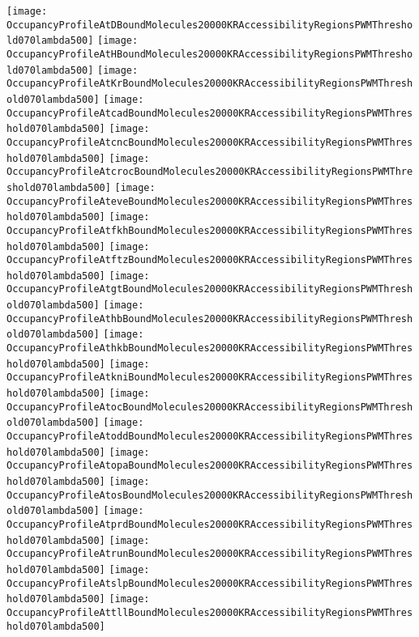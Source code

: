 \documentclass[11pt]{article}
\begin{document}
 


\begin{center}
\texttt{[image: OccupancyProfileAtDBoundMolecules20000KRAccessibilityRegionsPWMThreshold070lambda500]}
\texttt{[image: OccupancyProfileAtHBoundMolecules20000KRAccessibilityRegionsPWMThreshold070lambda500]}
\texttt{[image: OccupancyProfileAtKrBoundMolecules20000KRAccessibilityRegionsPWMThreshold070lambda500]}
\texttt{[image: OccupancyProfileAtcadBoundMolecules20000KRAccessibilityRegionsPWMThreshold070lambda500]}
\texttt{[image: OccupancyProfileAtcncBoundMolecules20000KRAccessibilityRegionsPWMThreshold070lambda500]}
\texttt{[image: OccupancyProfileAtcrocBoundMolecules20000KRAccessibilityRegionsPWMThreshold070lambda500]}
\texttt{[image: OccupancyProfileAteveBoundMolecules20000KRAccessibilityRegionsPWMThreshold070lambda500]}
\texttt{[image: OccupancyProfileAtfkhBoundMolecules20000KRAccessibilityRegionsPWMThreshold070lambda500]}
\texttt{[image: OccupancyProfileAtftzBoundMolecules20000KRAccessibilityRegionsPWMThreshold070lambda500]}
\texttt{[image: OccupancyProfileAtgtBoundMolecules20000KRAccessibilityRegionsPWMThreshold070lambda500]}
\texttt{[image: OccupancyProfileAthbBoundMolecules20000KRAccessibilityRegionsPWMThreshold070lambda500]}
\texttt{[image: OccupancyProfileAthkbBoundMolecules20000KRAccessibilityRegionsPWMThreshold070lambda500]}
\texttt{[image: OccupancyProfileAtkniBoundMolecules20000KRAccessibilityRegionsPWMThreshold070lambda500]}
\texttt{[image: OccupancyProfileAtocBoundMolecules20000KRAccessibilityRegionsPWMThreshold070lambda500]}
\texttt{[image: OccupancyProfileAtoddBoundMolecules20000KRAccessibilityRegionsPWMThreshold070lambda500]}
\texttt{[image: OccupancyProfileAtopaBoundMolecules20000KRAccessibilityRegionsPWMThreshold070lambda500]}
\texttt{[image: OccupancyProfileAtosBoundMolecules20000KRAccessibilityRegionsPWMThreshold070lambda500]}
\texttt{[image: OccupancyProfileAtprdBoundMolecules20000KRAccessibilityRegionsPWMThreshold070lambda500]}
\texttt{[image: OccupancyProfileAtrunBoundMolecules20000KRAccessibilityRegionsPWMThreshold070lambda500]}
\texttt{[image: OccupancyProfileAtslpBoundMolecules20000KRAccessibilityRegionsPWMThreshold070lambda500]}
\texttt{[image: OccupancyProfileAttllBoundMolecules20000KRAccessibilityRegionsPWMThreshold070lambda500]}
\end{center}


\end{document}
